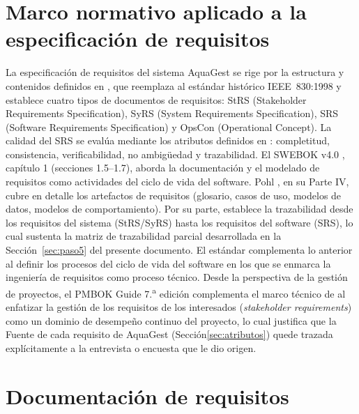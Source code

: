 \documentclass[11pt,a4paper]{report}
\begin{document}
\section{Marco normativo aplicado a la especificación de requisitos}

La especificación de requisitos del sistema AquaGest se rige por la estructura y contenidos definidos en \cite{iso29148}, que reemplaza al estándar histórico IEEE~830:1998 y establece cuatro tipos de documentos de requisitos: StRS (Stakeholder Requirements Specification), SyRS (System Requirements Specification), SRS (Software Requirements Specification) y OpsCon (Operational Concept). La calidad del SRS se eval\'ua mediante los atributos definidos en \cite{iso25010}: completitud, consistencia, verificabilidad, no ambig\"uedad y trazabilidad. El SWEBOK v4.0 \cite{swebok2024}, cap\'itulo 1 (secciones 1.5--1.7), aborda la documentaci\'on y el modelado de requisitos como actividades del ciclo de vida del software. Pohl \cite{pohl2025}, en su Parte IV, cubre en detalle los artefactos de requisitos (glosario, casos de uso, modelos de datos, modelos de comportamiento). Por su parte, \cite{iso15288} establece la trazabilidad desde los requisitos del sistema (StRS/SyRS) hasta los requisitos del software (SRS), lo cual sustenta la matriz de trazabilidad parcial desarrollada en la Secci\'on~\ref{sec:paso5} del presente documento. El estándar \cite{iso12207} complementa lo anterior al definir los procesos del ciclo de vida del software en los que se enmarca la ingeniería de requisitos como proceso técnico. Desde la perspectiva de la gestión de proyectos, el PMBOK Guide 7.\textsuperscript{a} edición \cite{pmi2021pmbok} complementa el marco técnico de \cite{iso29148} al enfatizar la gestión de los requisitos de los interesados (\emph{stakeholder requirements}) como un dominio de desempeño continuo del proyecto, lo cual justifica que la Fuente de cada requisito de AquaGest (Secci\'on\ref{sec:atributos}) quede trazada expl\'icitamente a la entrevista o encuesta que le dio origen.

\section{Documentación de requisitos}
\end{document}

